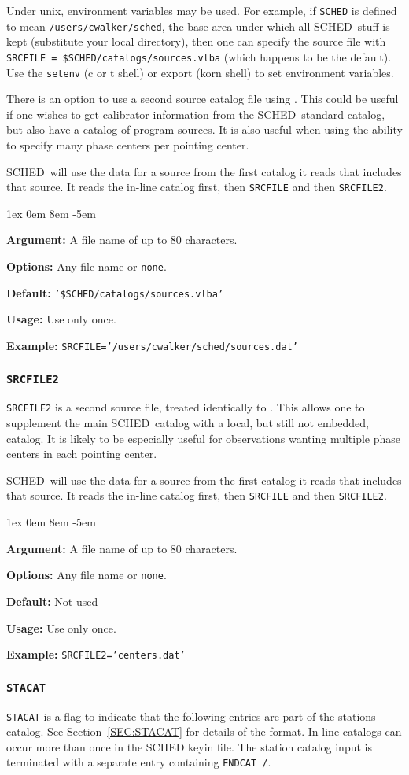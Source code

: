 \documentclass{report}
\newcommand{\schedb}{{\sc SCHED~}}
\newcommand{\rcwbox}[5]{
  \begin{list}{}{\parsep 1ex  \itemsep 0em
                 \leftmargin 8em  \itemindent -5em }
    \item {\bf Argument:} #1
    \item {\bf Options:}  #2
    \item {\bf Default:}  #3
    \item {\bf Usage:}    #4
    \item {\bf Example:}  #5
  \end{list}
}
\begin{document}
Under unix, environment variables may be used.  For example, if
{\tt SCHED} is defined to mean {\tt /users/cwalker/sched}, the
base area under which all \schedb stuff is kept (substitute your
local directory), then one can specify the source file with
{\tt SRCFILE = \$SCHED/catalogs/sources.vlba} (which happens to be
the default).  Use the {\tt setenv}
(c or t shell) or export (korn shell) to set environment variables.

There is an option to use a second source catalog file using
.  This could be useful if one
wishes to get calibrator information from the \schedb standard
catalog, but also have a catalog of program sources.  It is also
useful when using the ability to specify many phase centers per
pointing center.

\schedb will use the data for a source from the first catalog it
reads that includes that source.  It reads the in-line catalog first,
then {\tt SRCFILE} and then {\tt SRCFILE2}.

\rcwbox
{A file name of up to 80 characters.}
{Any file name or {\tt none}.}
{{\tt '\$SCHED/catalogs/sources.vlba'}}
{Use only once.}
{{\tt SRCFILE='/users/cwalker/sched/sources.dat'}}

\subsubsection{\label{MP:SRCFILE2}{\tt SRCFILE2}}

{\tt SRCFILE2} is a second source file, treated identically to
.  This allows one to supplement
the main \schedb catalog with a local, but still not embedded,
catalog.  It is likely to be especially useful for observations
wanting multiple phase centers in each pointing center.

\schedb will use the data for a source from the first catalog it
reads that includes that source.  It reads the in-line catalog first,
then {\tt SRCFILE} and then {\tt SRCFILE2}.

\rcwbox
{A file name of up to 80 characters.}
{Any file name or {\tt none}.}
{Not used}
{Use only once.}
{{\tt SRCFILE2='centers.dat'}}


\subsubsection{\label{MP:STACAT}{\tt STACAT}}

{\tt STACAT} is a flag to indicate that the following entries are part
of the stations catalog. See Section~\ref{SEC:STACAT} for details of
the format. In-line catalogs can occur more than once in the {\sc
SCHED} keyin file.  The station catalog input is terminated with a
separate entry containing {\tt ENDCAT /}.
\end{document}
